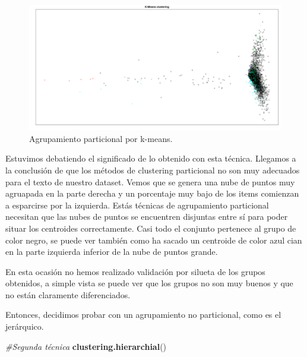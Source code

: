 \documentclass[spanish,]{article}
\newenvironment{Shaded}{\begin{snugshade}}{\end{snugshade}}
\newcommand{\KeywordTok}[1]{\textcolor[rgb]{0.13,0.29,0.53}{\textbf{#1}}}
\newcommand{\CommentTok}[1]{\textcolor[rgb]{0.56,0.35,0.01}{\textit{#1}}}
\newcommand{\NormalTok}[1]{#1}
\begin{document}
\begin{figure}[h]
    \centering
    \includegraphics[width=1\textwidth]{figuras/clustering/kmeans.png}
    \caption{Agrupamiento particional por k-means.}
    \label{fig:clustering:kmeans}
\end{figure}

Estuvimos debatiendo el significado de lo obtenido con esta técnica.
Llegamos a la conclusión de que los métodos de clustering particional no
son muy adecuados para el texto de nuestro dataset. Vemos que se genera
una nube de puntos muy agruapada en la parte derecha y un porcentaje muy
bajo de los items comienzan a esparcirse por la izquierda. Estás
técnicas de agrupamiento particional necesitan que las nubes de puntos
se encuentren disjuntas entre sí para poder situar los centroides
correctamente. Casi todo el conjunto pertenece al grupo de color negro,
se puede ver también como ha sacado un centroide de color azul cian en
la parte izquierda inferior de la nube de puntos grande.

En esta ocasión no hemos realizado validación por silueta de los grupos
obtenidos, a simple vista se puede ver que los grupos no son muy buenos
y que no están claramente diferenciados.

Entonces, decidimos probar con un agrupamiento no particional, como es
el jerárquico.

\newpage

\begin{Shaded}
\begin{Highlighting}[]
\CommentTok{#Segunda técnica}
\KeywordTok{clustering.hierarchial}\NormalTok{()}
\end{Highlighting}
\end{Shaded}
\end{document}
